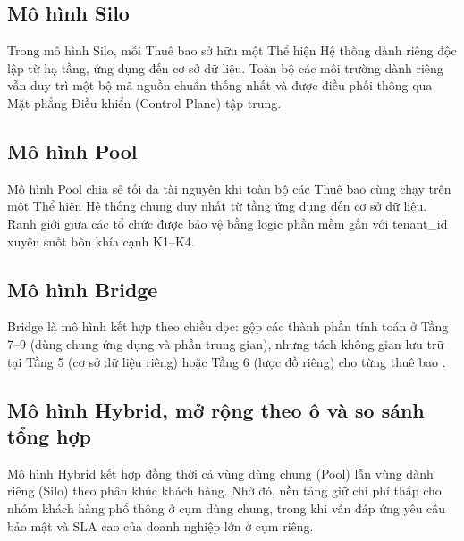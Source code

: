 \subsection{Mô hình Silo}\label{v4-sec-2-2-1}

Trong mô hình Silo, mỗi Thuê bao sở hữu một Thể hiện Hệ thống dành riêng độc lập từ hạ tầng, ứng dụng đến cơ sở dữ liệu. Toàn bộ các môi trường dành riêng vẫn duy trì một bộ mã nguồn chuẩn thống nhất và được điều phối thông qua Mặt phẳng Điều khiển (Control Plane) tập trung.


\subsection{Mô hình Pool}\label{v4-sec-2-2-2}

Mô hình Pool chia sẻ tối đa tài nguyên khi toàn bộ các Thuê bao cùng chạy trên một Thể hiện Hệ thống chung duy nhất từ tầng ứng dụng đến cơ sở dữ liệu. Ranh giới giữa các tổ chức được bảo vệ bằng logic phần mềm gắn với tenant\_\allowbreak{}id xuyên suốt bốn khía cạnh K1--K4.


\subsection{Mô hình Bridge}\label{v4-sec-2-2-3}

Bridge là mô hình kết hợp theo chiều dọc: gộp các thành phần tính toán ở Tầng 7--9 (dùng chung ứng dụng và phần trung gian), nhưng tách không gian lưu trữ tại Tầng 5 (cơ sở dữ liệu riêng) hoặc Tầng 6 (lược đồ riêng) cho từng thuê bao \cite{v4-16}.


\Needspace{.55\textheight}
\subsection{Mô hình Hybrid, mở rộng theo ô và so sánh tổng hợp}\label{v4-sec-2-2-4}

Mô hình Hybrid kết hợp đồng thời cả vùng dùng chung (Pool) lẫn vùng dành riêng (Silo) theo phân khúc khách hàng. Nhờ đó, nền tảng giữ chi phí thấp cho nhóm khách hàng phổ thông ở cụm dùng chung, trong khi vẫn đáp ứng yêu cầu bảo mật và SLA cao của doanh nghiệp lớn ở cụm riêng.

